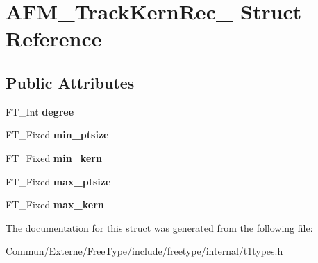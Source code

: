 \hypertarget{struct_a_f_m___track_kern_rec__}{}\section{A\+F\+M\+\_\+\+Track\+Kern\+Rec\+\_\+ Struct Reference}
\label{struct_a_f_m___track_kern_rec__}
\subsection*{Public Attributes}
\begin{DoxyCompactItemize}
\item 
F\+T\+\_\+\+Int {\bfseries degree}\hypertarget{struct_a_f_m___track_kern_rec___a15272593c1a0ea05ca3687e7c2de26b6}{}\label{struct_a_f_m___track_kern_rec___a15272593c1a0ea05ca3687e7c2de26b6}

\item 
F\+T\+\_\+\+Fixed {\bfseries min\+\_\+ptsize}\hypertarget{struct_a_f_m___track_kern_rec___a7b1e7fd74d92dcf2b89fee7f74d4fdba}{}\label{struct_a_f_m___track_kern_rec___a7b1e7fd74d92dcf2b89fee7f74d4fdba}

\item 
F\+T\+\_\+\+Fixed {\bfseries min\+\_\+kern}\hypertarget{struct_a_f_m___track_kern_rec___aee6f40c722e14ee2fb17948ce19d0499}{}\label{struct_a_f_m___track_kern_rec___aee6f40c722e14ee2fb17948ce19d0499}

\item 
F\+T\+\_\+\+Fixed {\bfseries max\+\_\+ptsize}\hypertarget{struct_a_f_m___track_kern_rec___a2b22a268fb0654a035ec59d3dfa3dfa4}{}\label{struct_a_f_m___track_kern_rec___a2b22a268fb0654a035ec59d3dfa3dfa4}

\item 
F\+T\+\_\+\+Fixed {\bfseries max\+\_\+kern}\hypertarget{struct_a_f_m___track_kern_rec___a8e25a36b738a2de3fa5c08e477b5a6a2}{}\label{struct_a_f_m___track_kern_rec___a8e25a36b738a2de3fa5c08e477b5a6a2}

\end{DoxyCompactItemize}


The documentation for this struct was generated from the following file\+:\begin{DoxyCompactItemize}
\item 
Commun/\+Externe/\+Free\+Type/include/freetype/internal/t1types.\+h\end{DoxyCompactItemize}
